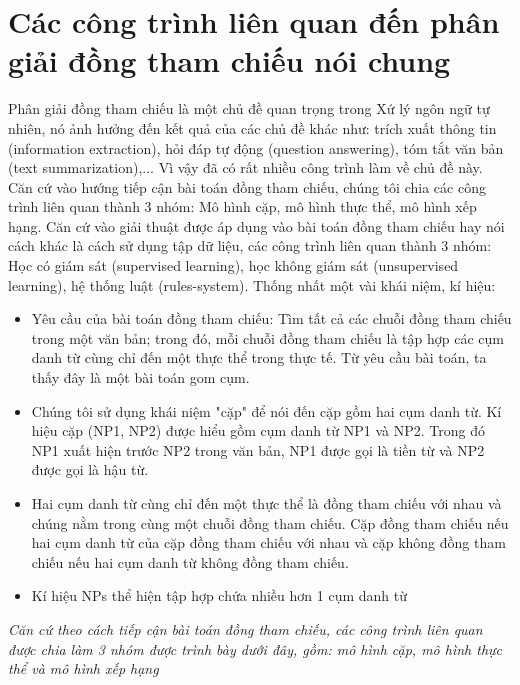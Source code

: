 \documentclass[12pt]{report}
\begin{document}
		\section{Các công trình liên quan đến phân giải đồng tham chiếu nói chung}
			\par Phân giải đồng tham chiếu là một chủ đề quan trọng trong Xứ lý ngôn ngữ tự nhiên, nó ảnh hưởng đến kết quả của các chủ đề khác như: trích xuất thông tin (information extraction), hỏi đáp tự động (question answering), tóm tắt văn bản (text summarization),... Vì vậy đã có rất nhiều công trình làm về chủ đề này. Căn cứ vào hướng tiếp cận bài toán đồng tham chiếu, chúng tôi chia các công trình liên quan thành 3 nhóm: Mô hình cặp, mô hình thực thể, mô hình xếp hạng. Căn cứ vào giải thuật được áp dụng vào bài toán đồng tham chiếu hay nói cách khác là cách sử dụng tập dữ liệu, các công trình liên quan thành 3 nhóm: Học có giám sát (supervised learning), học không giám sát (unsupervised learning), hệ thống luật (rules-system).
			Thống nhất một vài khái niệm, kí hiệu:
				\begin{itemize}
					\item{Yêu cầu của bài toán đồng tham chiếu: Tìm tất cả các chuỗi đồng tham chiếu trong một văn bản; trong đó, mỗi chuỗi đồng tham chiếu là tập hợp các cụm danh từ cùng chỉ đến một thực thể trong thực tế. Từ yêu cầu bài toán, ta thấy đây là một bài toán gom cụm.} 
					\item{Chúng tôi sử dụng khái niệm "cặp" để nói đến cặp gồm hai cụm danh từ. Kí hiệu cặp (NP1, NP2) được hiểu gồm cụm danh từ NP1 và NP2. Trong đó NP1 xuất hiện trước NP2 trong văn bản, NP1 được gọi là tiền từ và NP2 được gọi là hậu từ.}
					\item{Hai cụm danh từ cùng chỉ đến một thực thể là đồng tham chiếu với nhau và chúng nằm trong cùng một chuỗi đồng tham chiếu. Cặp đồng tham chiếu nếu hai cụm danh từ của cặp đồng tham chiếu với nhau và cặp không đồng tham chiếu nếu hai cụm danh từ không đồng tham chiếu.}
					\item{Kí hiệu NPs thể hiện tập hợp chứa nhiều hơn 1 cụm danh từ}
				\end{itemize}
			\par \textit{Căn cứ theo cách tiếp cận bài toán đồng tham chiếu, các công trình liên quan được chia làm 3 nhóm được trình bày dưới đây, gồm: mô hình cặp, mô hình thực thể và mô hình xếp hạng}
\end{document}

